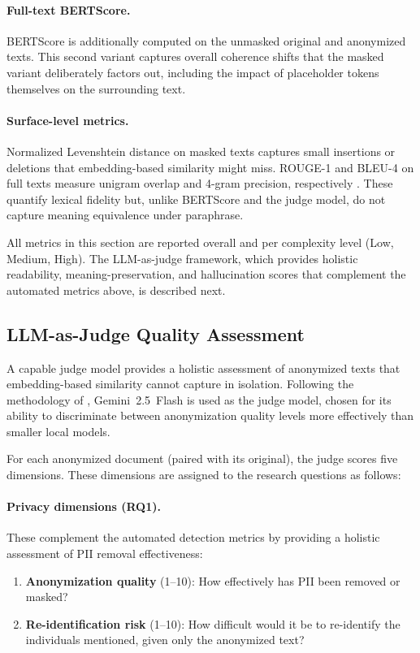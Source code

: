 \paragraph{Full-text BERTScore.} BERTScore is additionally computed on
the unmasked original and anonymized texts. This second variant captures
overall coherence shifts that the masked variant deliberately factors
out, including the impact of placeholder tokens themselves on the
surrounding text.

\paragraph{Surface-level metrics.} Normalized Levenshtein distance on
masked texts captures small insertions or deletions that embedding-based
similarity might miss. ROUGE-1 and BLEU-4 on full texts measure unigram
overlap and 4-gram precision, respectively \citep{staab2025iclr}. These
quantify lexical fidelity but, unlike BERTScore and the judge model, do
not capture meaning equivalence under paraphrase.

All metrics in this section are reported overall and per complexity
level (Low, Medium, High). The LLM-as-judge framework, which provides
holistic readability, meaning-preservation, and hallucination scores
that complement the automated metrics above, is described next.


\subsection{LLM-as-Judge Quality Assessment}
\label{sec:eval_judge}

A capable judge model provides a holistic assessment of anonymized texts
that embedding-based similarity cannot capture in isolation. Following
the methodology of \citet{staab2025iclr}, Gemini~2.5~Flash is used as
the judge model, chosen for its ability to discriminate between
anonymization quality levels more effectively than smaller local
models.

For each anonymized document (paired with its original), the judge scores five
dimensions. These dimensions are assigned to the research questions as follows:

\paragraph{Privacy dimensions (RQ1).} These complement the automated detection
metrics by providing a holistic assessment of PII removal effectiveness:
\begin{enumerate}
    \item \textbf{Anonymization quality} (1--10): How effectively has PII been
    removed or masked?

    \item \textbf{Re-identification risk} (1--10): How difficult would it be
    to re-identify the individuals mentioned, given only the anonymized text?
\end{enumerate}

